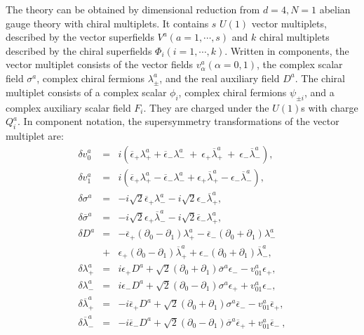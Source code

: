 \documentclass[a4paper,12pt]{article}
\begin{document}
The theory can be obtained by dimensional reduction from
$d=4,N=1$ abelian gauge theory with chiral multiplets.  It contains $s$
$U(1)$ vector multiplets, described by the vector superfields $V^a
(a=1,\cdots, s)$ and $k$ chiral multiplets described by the chiral
superfields $\Phi_i (i= 1,\cdots,k)$. Written in components, the vector
multiplet consists of the vector fields $v^a_{\alpha} (\alpha=0,1)$, the
complex scalar field $\sigma^a$, complex chiral fermions
$\lambda_{\pm}^a$, and the real auxiliary field $D^a$.  The chiral
multiplet consists of a complex scalar $\phi_i$, complex chiral fermions
$\psi_{\pm i}$, and a complex auxiliary scalar field $F_i$. They are
charged under the $U(1)$s with charge $Q_i^a$. In component notation, the
supersymmetry transformations of the vector multiplet are: 
\begin{eqnarray}
\delta v_0^a&=&i \left(\overline{\epsilon}_+ \lambda_+^a 
+\overline{\epsilon}_-\lambda_-^a ~+~\epsilon_+\overline{\lambda}_+^a
~+~\epsilon_-\overline{\lambda}_-^a \right), \nonumber \\
\delta v_1^a&=& i\left( \overline{\epsilon}_+ \lambda_+^a -  
\overline{\epsilon}_- \lambda_-^a+\epsilon_+ \overline{\lambda}_+^a
-\epsilon_- \overline{\lambda}_-^a \right), \nonumber \\
\delta \sigma^a&=&-i \sqrt{2} \overline{\epsilon}_+
\lambda_-^a -i\sqrt{2}\epsilon_-\overline{\lambda}_+^a,\nonumber \\
\delta \overline{\sigma}^a&=&-i \sqrt{2}\epsilon_+\overline{\lambda}_-^a -i
\sqrt{2}\overline{\epsilon}_-\lambda_+^a, \nonumber \\
\delta D^a&=&- \overline{\epsilon}_+(\partial_0 - \partial_1)\lambda_+^a
-\overline
{\epsilon}_-(\partial_0 + \partial_1)\lambda_-^a \\ 
&+&\epsilon_+(\partial_0 -
\partial_1) \overline{\lambda}_+^a +\epsilon_-(\partial_0 + \partial_1)
\overline{\lambda}_-^a, \nonumber \\
\delta \lambda_+^a&=&i\epsilon_+D^a+\sqrt{2}
(\partial_0+\partial_1)\overline{\sigma}^a
\epsilon_- -v^a_{01} \epsilon_+, \nonumber \\
\delta \lambda_-^a&=&i \epsilon_-D^a+\sqrt{2}(\partial_0- \partial_1)\sigma^a
\epsilon_+ +v^a_{01}\epsilon_-, \nonumber \\
\delta \overline{\lambda}_+^a&=&-i \overline{\epsilon}_+D^a
+\sqrt{2}(\partial_0 + \partial_1) \sigma^a\overline{\epsilon}_- 
-v^a_{01}\overline{\epsilon}_+ \nonumber, \\
\delta \overline{\lambda}_-^a&=&-i \overline{\epsilon}_-D^a
+\sqrt{2}(\partial_0 - \partial_1)\overline{\sigma}^a \overline{\epsilon}_+ 
+v_{01}^a\overline{\epsilon}_- \ ,\nonumber
\label{vectortrans}
\end{eqnarray}
\end{document}
